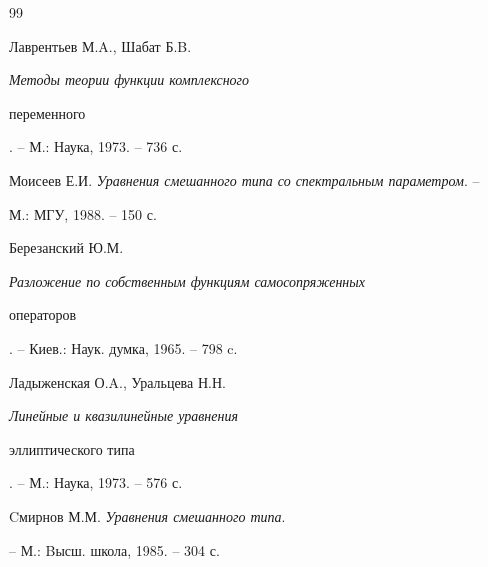 \begin{thebibliography}{99}


Лаврентьев М.A., Шабат Б.B. {\em Методы теории функции комплексного 


переменного}. -- М.: Наука, 1973. -- 736 с.




Моисеев Е.И. {\em Уравнения смешанного типа со спектральным параметром}. --


М.: МГУ, 1988. -- 150 с.




Березанский Ю.М. {\em Разложение по собственным функциям самосопряженных 


операторов}. -- Киев.: Наук. думка, 1965. -- 798 c.




Ладыженская О.A., Уральцева Н.Н. {\em Линейные и квазилинейные уравнения 


эллиптического типа}. -- М.: Наука, 1973. -- 576 с.




Cмирнов М.М. {\em Уравнения смешанного типа}.


-- М.: Bысш. школа, 1985. -- 304 с.





\end{thebibliography}





\vskip 2cm









\smallskip









\label{end}






